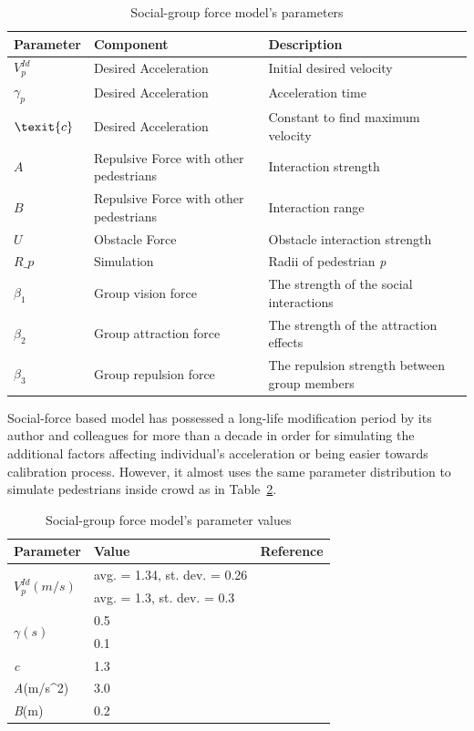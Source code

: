 \documentclass[a4paper,11pt,phdthesis,singlespace,twoside]{cssethesis}
\begin{document}
\begin{table}[H]
\caption{Social-group force model's parameters}
\begin{tabular}{|l|l|l|} \hline
\textbf{Parameter} & \textbf{Component} & \textbf{Description} \\ \hline
$ V_{p}^{Id}$ &Desired Acceleration& Initial desired velocity \\ \hline
$ \gamma_{p}$ &Desired Acceleration& Acceleration time \\ \hline
$\texit{c}$ &Desired Acceleration& Constant to find maximum velocity  \\ \hline
$ \textit{A}$ & Repulsive Force with other pedestrians& Interaction strength \\ \hline
$ \textit{B}$ & Repulsive Force with other pedestrians& Interaction range \\ \hline
$ \textit{U}$ & Obstacle Force & Obstacle interaction strength  \\ \hline 
$ \textit{R_{p}}$ &  Simulation & Radii of pedestrian \textit{p}\\ \hline 
$ \beta_{1}$ &  Group vision force & The strength of the social interactions\\ \hline 
$ \beta_{2}$ &  Group attraction force & The strength of the attraction effects \\ \hline 
$ \beta_{3}$ &  Group repulsion force & The repulsion strength between group members\\ \hline 
\end{tabular}
\label{tab:model_params}
\end{table}
Social-force based model has possessed a long-life modification period by its author and colleagues for more than a decade in order for simulating the additional factors affecting individual's acceleration or being easier towards calibration process. However, it almost uses the same parameter distribution to simulate pedestrians inside crowd as in Table~\ref{tab:model_params_values}.
\begin{table}[H]
\caption{Social-group force model's parameter values}
\begin{center}
\begin{tabular}{|l|l|l|} \hline
\textbf{Parameter} & \textbf{Value} & \textbf{Reference} \\ \hline
\multirow{2}{*}{$ V_{p}^{Id}(m/s)$}& avg. = 1.34, st. dev. = 0.26 & \cite{Helbing1995}\\ 
															& avg. = 1.3, st. dev. = 0.3 & \cite{Helbing2005} \\ \hline
\multirow{2}{*}{$ \gamma(s)$}& 0.5 & \cite{Helbing1995}\\ 
															& 0.1 & \cite{Helbing2000} \cite{Helbing2005}\\ \hline
\textit{c}&1.3&\cite{Helbing1995} \cite{Helbing2000} \\ \hline
\textit{A}(m/s^{2})&3.0 &\cite{Helbing2005}\\ \hline
\textit{B}(m)&0.2&\cite{Helbing2005}\\ \hline	 																										
\end{tabular}
\end{center}
\label{tab:model_params_values}
\end{table}
\end{document}
